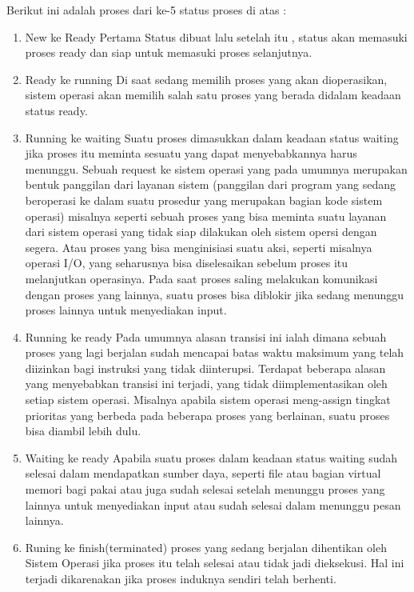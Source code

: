 	Berikut ini adalah proses dari ke-5 status proses di atas :
	\begin{enumerate}
		\item New ke Ready
		Pertama Status dibuat lalu setelah itu , status akan memasuki proses ready dan siap untuk memasuki proses selanjutnya.
		\item Ready ke running
		Di saat sedang memilih proses yang akan dioperasikan, sistem operasi akan memilih salah satu proses yang berada didalam keadaan status ready.
		\item Running ke waiting
		Suatu proses dimasukkan dalam keadaan status waiting jika proses itu meminta sesuatu yang dapat menyebabkannya harus menunggu. Sebuah request ke sistem operasi yang pada umumnya merupakan bentuk panggilan dari layanan sistem (panggilan dari program yang sedang beroperasi ke dalam suatu prosedur yang merupakan bagian kode sistem operasi) misalnya seperti sebuah proses yang bisa meminta suatu layanan dari sistem operasi yang tidak siap dilakukan oleh sistem opersi dengan segera. Atau proses yang bisa menginisiasi suatu aksi, seperti misalnya operasi I/O, yang seharusnya bisa diselesaikan sebelum proses itu melanjutkan operasinya. Pada saat proses saling melakukan komunikasi dengan proses yang lainnya, suatu proses bisa diblokir jika sedang menunggu proses lainnya untuk menyediakan input.
		\item Running ke ready
		Pada umumnya alasan transisi ini ialah dimana sebuah proses yang lagi berjalan sudah mencapai batas waktu maksimum yang telah diizinkan bagi instruksi yang tidak diinterupsi. Terdapat beberapa alasan yang menyebabkan transisi ini terjadi, yang tidak diimplementasikan oleh setiap sistem operasi. Misalnya apabila sistem operasi meng-assign tingkat prioritas yang berbeda pada beberapa proses yang berlainan, suatu proses bisa diambil lebih dulu.
		\item Waiting ke ready
		Apabila suatu proses dalam keadaan status waiting sudah selesai dalam mendapatkan sumber daya, seperti file atau bagian virtual memori bagi pakai atau juga sudah selesai setelah menunggu proses yang lainnya untuk menyediakan input atau sudah selesai dalam menunggu pesan lainnya.
		\item Runing ke finish(terminated)
		proses yang sedang berjalan dihentikan oleh Sistem Operasi jika proses itu telah selesai atau tidak jadi dieksekusi. Hal ini terjadi dikarenakan jika proses induknya sendiri telah berhenti.
	\end{enumerate}
	
